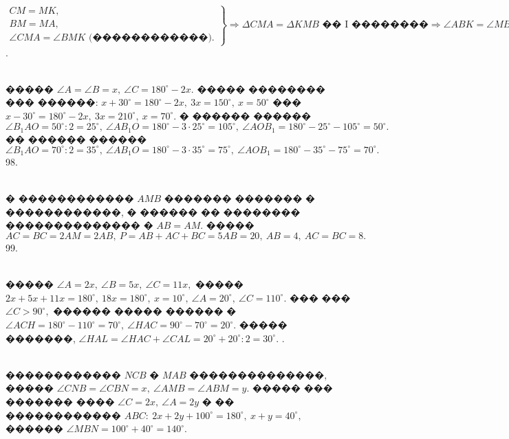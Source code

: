 \documentclass[12pt]{article}
\begin{document}
$\left.\begin{array}{l}CM=MK,\\
BM=MA,\\
\angle CMA=\angle BMK\text{ (������������).}\end{array}\right\}\Rightarrow \Delta CMA=\Delta KMB\text{ �� I ��������}\Rightarrow \angle ABK=\angle MBK=\angle A=54^\circ.$\newpage
{}. \begin{figure}[ht!]
\end{figure}\\
����� $\angle A=\angle B=x,\ \angle C=180^\circ-2x.$ ����� �������� ��� ������: $x+30^\circ=180^\circ-2x,\ 3x=150^\circ,\ x=50^\circ$ ��� $x-30^\circ=180^\circ-2x,\
3x=210^\circ,\ x=70^\circ.$ � ������ ������  $\angle B_1AO=50^\circ:2=25^\circ,\ \angle AB_1O=180^\circ-3\cdot25^\circ=105^\circ,\ \angle AOB_1=180^\circ-25^\circ-105^\circ=50^\circ.$ �� ������ ������  $\angle B_1AO=70^\circ:2=35^\circ,\ \angle AB_1O=180^\circ-3\cdot35^\circ=75^\circ,\ \angle AOB_1=180^\circ-35^\circ-75^\circ=70^\circ.$\\
98. \begin{figure}[ht!]
\end{figure}\\
� ������������ $AMB$ ������� ������� � ������������, � ������ �� �������� �������������� � $AB=AM.$ ����� $AC=BC=2AM=2AB,\ P=AB+AC+BC=5AB=20,\ AB=4,\ AC=BC=8.$\\
99.\begin{figure}[ht!]
\end{figure}\\
����� $\angle A=2x,\ \angle B=5x,\ \angle C=11x,$ ����� $2x+5x+11x=180^\circ,\ 18x=180^\circ,\ x=10^\circ,\ \angle A=20^\circ,\ \angle C=110^\circ.$ ��� ��� $\angle C>90^\circ,$ ������ ����� ������ �  $\angle ACH=180^\circ-110^\circ=70^\circ,\ \angle HAC=90^\circ-70^\circ=20^\circ.$ ����� �������, $\angle HAL=\angle HAC+\angle CAL=20^\circ+20^\circ:2=30^\circ.$\newpage
\noindent100. \begin{figure}[ht!]
\end{figure}\\
������������ $NCB$ � $MAB$ ��������������, ����� $\angle CNB=\angle CBN=x,\ \angle AMB=\angle ABM=y.$ ����� ��� ������� ���� $\angle C=2x,\ \angle A=2y$ � �� ������������ $ABC:\ 2x+2y+100^\circ=180^\circ,\ x+y=40^\circ,$ ������ $\angle MBN=100^\circ+40^\circ=140^\circ.$\\
\end{document}
